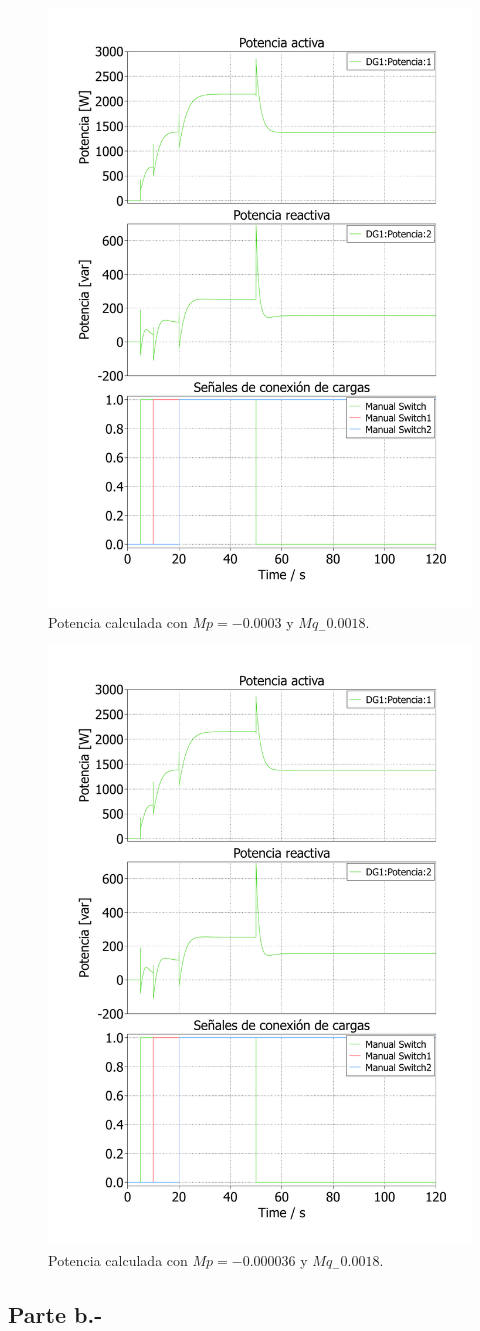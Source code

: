 \begin{figure}
   \centering
   \includegraphics[width=0.5\linewidth]{Tarea 1/report/imagenes/p3a/droop_2.pdf}
   \caption{Potencia calculada con $Mp = -0.0003$ y $Mq_-0.0018$.}
   \label{droop_2}
\end{figure}

\begin{figure}
   \centering
   \includegraphics[width=0.5\linewidth]{Tarea 1/report/imagenes/p3a/droop_3.pdf}
   \caption{Potencia calculada con $Mp = -0.000036$ y $Mq_-0.0018$.}
   \label{droop_3}
\end{figure}

\subsection{Parte b.-}


